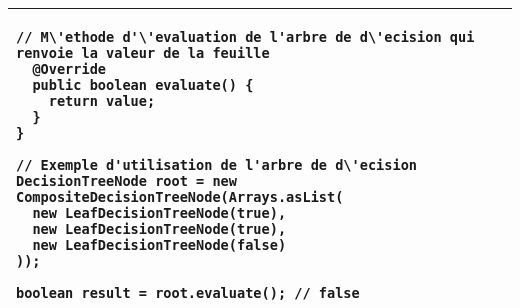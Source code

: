 \begin{table}[H]
\begin{adjustbox}{max width=\textwidth}
\begin{tabular}{l|p{\textwidth}}
\begin{minipage}[tr]{0.5\textwidth}
\begin{lstlisting}[style=monstyle]
  // M\'ethode d'\'evaluation de l'arbre de d\'ecision qui renvoie la valeur de la feuille
  @Override
  public boolean evaluate() {
    return value;
  }
}

// Exemple d'utilisation de l'arbre de d\'ecision
DecisionTreeNode root = new CompositeDecisionTreeNode(Arrays.asList(
  new LeafDecisionTreeNode(true),
  new LeafDecisionTreeNode(true),
  new LeafDecisionTreeNode(false)
));

boolean result = root.evaluate(); // false
\end{lstlisting}
\end{minipage}
\\
\bottomrule
\end{tabular}
\end{adjustbox}
\end{table}